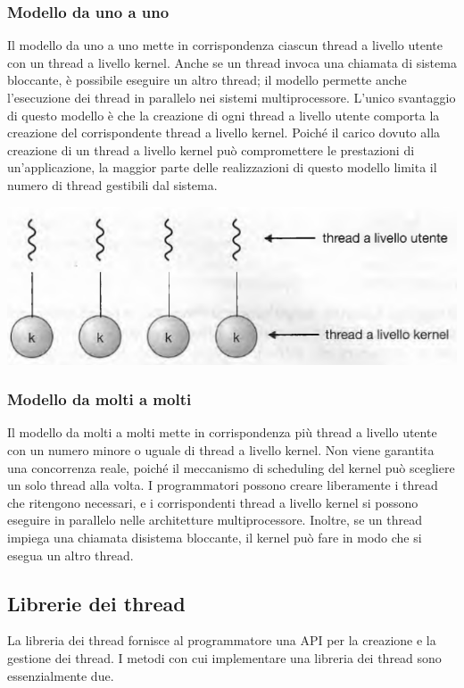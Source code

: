 \documentclass[11pt,a4paper]{article}
\begin{document}
\subsubsection{Modello da uno a uno}
Il modello da uno a uno  mette in corrispondenza ciascun thread a livello uten­te con un thread a livello kernel.
Anche se un thread invoca una chiamata di sistema bloccante, è
possibile eseguire un altro thread; il modello permette anche l'esecuzione dei thread in pa­rallelo nei sistemi multiprocessore. L'unico svantaggio di questo modello è che la creazione
di ogni thread a livello utente comporta la creazione del corrispondente thread a livello ker­nel. Poiché il carico dovuto alla creazione di un thread a livello kernel può compromettere le
prestazioni di un'applicazione, la maggior parte delle realizzazioni di questo modello limita
il numero di thread gestibili dal sistema.
\begin{center}
  \includegraphics[scale=0.45]{img/0013.png}
\end{center}

\subsubsection{Modello da molti a molti}
Il modello da molti a molti mette in corrispondenza più thread a livello utente
con un numero minore o uguale di thread a livello kernel.
Non viene garantita una concorrenza reale, poiché il meccanismo di scheduling del kernel
può scegliere un solo thread alla volta.
I pro­grammatori possono creare liberamente i thread che ritengono necessari, e i corrispondenti
thread a livello kernel si possono eseguire in parallelo nelle architetture multiprocessore.
Inoltre, se un thread impiega una chiamata disistema bloccante, il kernel può fare in modo
che si esegua un altro thread.

\subsection{Librerie dei thread}
La libreria dei thread fornisce al programmatore una API per la creazione e la gestione dei
thread. I metodi con cui implementare una libreria dei thread sono essenzialmente due.
\end{document}

